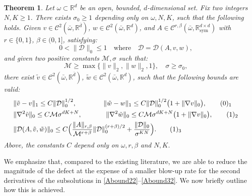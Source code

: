 \documentclass[reqno,twoside,11pt]{amsart}
\newcommand{\sym}{\mathrm{sym}}
\newcommand{\R}{\mathbb{R}}
\numberwithin{equation}{section}
\theoremstyle{plain}
\newtheorem{theorem}{Theorem}[section]
\theoremstyle{definition}
\begin{document}
\begin{theorem}\label{thm_stage} 
Let $\omega\subset\R^d$ be an open, bounded, $d$-dimensional set. Fix
two integers $N, K\geq 1$. There exists $\sigma_0\geq 1$ depending
only on $\omega, N, K$, such that the following holds.
Given $v\in\mathcal{C}^2(\bar\omega,\R^{\bar d})$, 
$w\in\mathcal{C}^2(\bar\omega,\R^{d})$, and 
$A\in\mathcal{C}^{r,\beta}(\bar\omega,\R^{d\times
  d}_\sym)$ with $r\in \{0,1\}$, $\beta\in (0,1]$, satisfying:
\begin{equation}\label{defect0}
0< \|\mathcal{D}\|_0\leq 1 \quad \mbox{where} \quad
\mathcal{D}=\mathcal{D}(A, v, w),
\end{equation}
and given two positive constants $\mathcal{M}, \sigma$ such that:
\begin{equation}\label{Assu}
\mathcal{M}\geq\max\{\|v\|_2, \|w\|_2, 1\},\quad \sigma\geq \sigma_0,
\end{equation}
there exist $\tilde v\in\mathcal{C}^2(\bar \omega,\R^{\bar d})$,
$\tilde w\in\mathcal{C}^{2}(\bar\omega, \R^d)$,
such that the following bounds are valid:
\begin{align*}
& \|\tilde v - v\|_1\leq C\|\mathcal{D}\|_0^{1/2}, \qquad\qquad
\|\tilde w -w\|_1\leq C\|\mathcal{D}\|_0^{1/2} \big(1+ \|\nabla v\|_0\big), 
\vspace{3mm} \tag*{(\theequation)$_1$}\refstepcounter{equation} \label{Abound12}\\
& \|\nabla^2\tilde v\|_0\leq C \mathcal{M}\sigma^{dK+N}, \hspace{12.5mm}
\|\nabla^2\tilde w\|_0\leq C \mathcal{M}\sigma^{dK+N} \big(1+\|\nabla v\|_0\big),  
\vspace{3mm} \tag*{(\theequation)$_2$}\label{Abound22} \\ 
& \displaystyle{\|\mathcal{D}(A, \tilde v, \tilde w)\|_0\leq
  C\Big(\frac{\|A\|_{r,\beta}}{\mathcal{M}^{r+\beta}}\|\mathcal{D}\|_0^{(r+\beta)/2}
  + \frac{\|\mathcal{D}\|_0}{\sigma^{KN}}\Big).}
\tag*{(\theequation)$_3$} \label{Abound32}
\end{align*}
Above, the constants $C$ depend only on $\omega, r,\beta$ and $N, K$.
\end{theorem}

\smallskip

\noindent We emphasize that, compared to the existing literature, we
are able to reduce the magnitude of the defect at the expense of a
smaller blow-up rate for the second derivatives of the subsolutions in
\ref{Abound22}–\ref{Abound32}. We now briefly outline how this is achieved.
\end{document}
